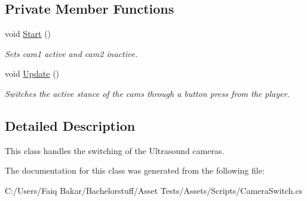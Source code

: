 \subsection*{Private Member Functions}
\begin{DoxyCompactItemize}
\item 
\mbox{\label{class_camera_switch_a0f20586833a0c26dff64929281ace514}} 
void \mbox{\hyperlink{class_camera_switch_a0f20586833a0c26dff64929281ace514}{Start}} ()
\begin{DoxyCompactList}\small\item\em Sets cam1 active and cam2 inactive. \end{DoxyCompactList}\item 
\mbox{\label{class_camera_switch_a85330e59866ffe2134bac5f8c8cec4db}} 
void \mbox{\hyperlink{class_camera_switch_a85330e59866ffe2134bac5f8c8cec4db}{Update}} ()
\begin{DoxyCompactList}\small\item\em Switches the active stance of the cams through a button press from the player. \end{DoxyCompactList}\end{DoxyCompactItemize}


\subsection{Detailed Description}
This class handles the switching of the Ultrasound cameras. 

The documentation for this class was generated from the following file\+:\begin{DoxyCompactItemize}
\item 
C\+:/\+Users/\+Faiq Bakar/\+Bachelorstuff/\+Asset Tests/\+Assets/\+Scripts/Camera\+Switch.\+cs\end{DoxyCompactItemize}
